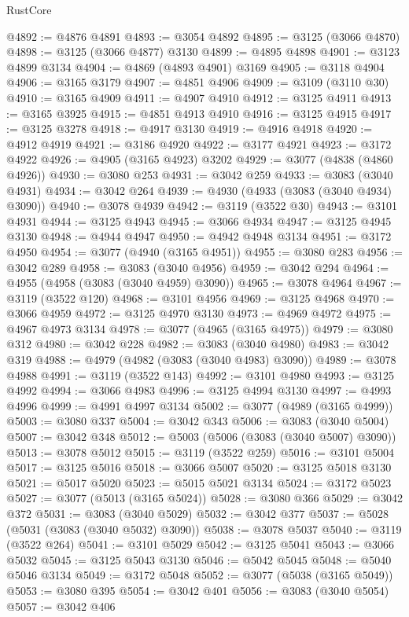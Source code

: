 \begin{lexlean}{RustCore}
\begin{coremodule}
@4892 := @4876 @4891
@4893 := @3054 @4892
@4895 := @3125 (@3066 @4870)
@4898 := @3125 (@3066 @4877) @3130
@4899 := @4895 @4898
@4901 := @3123 @4899 @3134
@4904 := @4869 (@4893 @4901) @3169
@4905 := @3118 @4904
@4906 := @3165 @3179
@4907 := @4851 @4906
@4909 := @3109 (@3110 @30)
@4910 := @3165 @4909
@4911 := @4907 @4910
@4912 := @3125 @4911
@4913 := @3165 @3925
@4915 := @4851 @4913 @4910
@4916 := @3125 @4915
@4917 := @3125 @3278
@4918 := @4917 @3130
@4919 := @4916 @4918
@4920 := @4912 @4919
@4921 := @3186 @4920
@4922 := @3177 @4921
@4923 := @3172 @4922
@4926 := @4905 (@3165 @4923) @3202
@4929 := @3077 (@4838 (@4860 @4926))
@4930 := @3080 @253
@4931 := @3042 @259
@4933 := @3083 (@3040 @4931)
@4934 := @3042 @264
@4939 := @4930 (@4933 (@3083 (@3040 @4934) @3090))
@4940 := @3078 @4939
@4942 := @3119 (@3522 @30)
@4943 := @3101 @4931
@4944 := @3125 @4943
@4945 := @3066 @4934
@4947 := @3125 @4945 @3130
@4948 := @4944 @4947
@4950 := @4942 @4948 @3134
@4951 := @3172 @4950
@4954 := @3077 (@4940 (@3165 @4951))
@4955 := @3080 @283
@4956 := @3042 @289
@4958 := @3083 (@3040 @4956)
@4959 := @3042 @294
@4964 := @4955 (@4958 (@3083 (@3040 @4959) @3090))
@4965 := @3078 @4964
@4967 := @3119 (@3522 @120)
@4968 := @3101 @4956
@4969 := @3125 @4968
@4970 := @3066 @4959
@4972 := @3125 @4970 @3130
@4973 := @4969 @4972
@4975 := @4967 @4973 @3134
@4978 := @3077 (@4965 (@3165 @4975))
@4979 := @3080 @312
@4980 := @3042 @228
@4982 := @3083 (@3040 @4980)
@4983 := @3042 @319
@4988 := @4979 (@4982 (@3083 (@3040 @4983) @3090))
@4989 := @3078 @4988
@4991 := @3119 (@3522 @143)
@4992 := @3101 @4980
@4993 := @3125 @4992
@4994 := @3066 @4983
@4996 := @3125 @4994 @3130
@4997 := @4993 @4996
@4999 := @4991 @4997 @3134
@5002 := @3077 (@4989 (@3165 @4999))
@5003 := @3080 @337
@5004 := @3042 @343
@5006 := @3083 (@3040 @5004)
@5007 := @3042 @348
@5012 := @5003 (@5006 (@3083 (@3040 @5007) @3090))
@5013 := @3078 @5012
@5015 := @3119 (@3522 @259)
@5016 := @3101 @5004
@5017 := @3125 @5016
@5018 := @3066 @5007
@5020 := @3125 @5018 @3130
@5021 := @5017 @5020
@5023 := @5015 @5021 @3134
@5024 := @3172 @5023
@5027 := @3077 (@5013 (@3165 @5024))
@5028 := @3080 @366
@5029 := @3042 @372
@5031 := @3083 (@3040 @5029)
@5032 := @3042 @377
@5037 := @5028 (@5031 (@3083 (@3040 @5032) @3090))
@5038 := @3078 @5037
@5040 := @3119 (@3522 @264)
@5041 := @3101 @5029
@5042 := @3125 @5041
@5043 := @3066 @5032
@5045 := @3125 @5043 @3130
@5046 := @5042 @5045
@5048 := @5040 @5046 @3134
@5049 := @3172 @5048
@5052 := @3077 (@5038 (@3165 @5049))
@5053 := @3080 @395
@5054 := @3042 @401
@5056 := @3083 (@3040 @5054)
@5057 := @3042 @406

\end{coremodule}
\end{lexlean}
